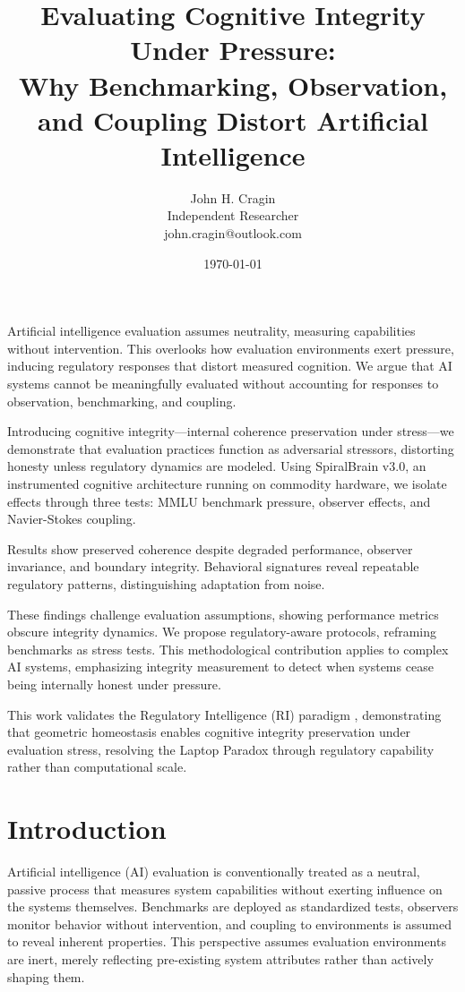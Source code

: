 \documentclass[12pt,a4paper]{report}
\title{Evaluating Cognitive Integrity Under Pressure:\\
Why Benchmarking, Observation, and Coupling Distort Artificial Intelligence}
\author{John H. Cragin \\
Independent Researcher \\
john.cragin@outlook.com}
\date{\today}
\begin{document}
\maketitle

Artificial intelligence evaluation assumes neutrality, measuring capabilities without intervention. This overlooks how evaluation environments exert pressure, inducing regulatory responses that distort measured cognition. We argue that AI systems cannot be meaningfully evaluated without accounting for responses to observation, benchmarking, and coupling.

Introducing cognitive integrity—internal coherence preservation under stress—we demonstrate that evaluation practices function as adversarial stressors, distorting honesty unless regulatory dynamics are modeled. Using SpiralBrain v3.0, an instrumented cognitive architecture running on commodity hardware, we isolate effects through three tests: MMLU benchmark pressure, observer effects, and Navier-Stokes coupling.

Results show preserved coherence despite degraded performance, observer invariance, and boundary integrity. Behavioral signatures reveal repeatable regulatory patterns, distinguishing adaptation from noise.

These findings challenge evaluation assumptions, showing performance metrics obscure integrity dynamics. We propose regulatory-aware protocols, reframing benchmarks as stress tests. This methodological contribution applies to complex AI systems, emphasizing integrity measurement to detect when systems cease being internally honest under pressure.

This work validates the Regulatory Intelligence (RI) paradigm \cite{Cragin2026RI}, demonstrating that geometric homeostasis enables cognitive integrity preservation under evaluation stress, resolving the Laptop Paradox through regulatory capability rather than computational scale.

\section{Introduction}

Artificial intelligence (AI) evaluation is conventionally treated as a neutral, passive process that measures system capabilities without exerting influence on the systems themselves. Benchmarks are deployed as standardized tests, observers monitor behavior without intervention, and coupling to environments is assumed to reveal inherent properties. This perspective assumes evaluation environments are inert, merely reflecting pre-existing system attributes rather than actively shaping them.
\end{document}
